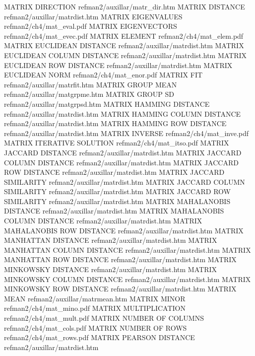 MATRIX DIRECTION                        refman2/auxillar/matr_dir.htm
MATRIX DISTANCE                         refman2/auxillar/matrdist.htm
MATRIX EIGENVALUES                      refman2/ch4/mat_eval.pdf
MATRIX EIGENVECTORS                     refman2/ch4/mat_evec.pdf
MATRIX ELEMENT                          refman2/ch4/mat_elem.pdf
MATRIX EUCLIDEAN DISTANCE               refman2/auxillar/matrdist.htm
MATRIX EUCLIDEAN COLUMN DISTANCE        refman2/auxillar/matrdist.htm
MATRIX EUCLIDEAN ROW DISTANCE           refman2/auxillar/matrdist.htm
MATRIX EUCLIDEAN NORM                   refman2/ch4/mat_enor.pdf
MATRIX FIT                              refman2/auxillar/matrfit.htm
MATRIX GROUP MEAN                       refman2/auxillar/matgrpme.htm
MATRIX GROUP SD                         refman2/auxillar/matgrpsd.htm
MATRIX HAMMING DISTANCE                 refman2/auxillar/matrdist.htm
MATRIX HAMMING COLUMN DISTANCE          refman2/auxillar/matrdist.htm
MATRIX HAMMING ROW DISTANCE             refman2/auxillar/matrdist.htm
MATRIX INVERSE                          refman2/ch4/mat_inve.pdf
MATRIX ITERATIVE SOLUTION               refman2/ch4/mat_itso.pdf
MATRIX JACCARD DISTANCE                 refman2/auxillar/matrdist.htm
MATRIX JACCARD COLUMN DISTANCE          refman2/auxillar/matrdist.htm
MATRIX JACCARD ROW DISTANCE             refman2/auxillar/matrdist.htm
MATRIX JACCARD SIMILARITY               refman2/auxillar/matrdist.htm
MATRIX JACCARD COLUMN SIMILARITY        refman2/auxillar/matrdist.htm
MATRIX JACCARD ROW SIMILARITY           refman2/auxillar/matrdist.htm
MATRIX MAHALANOBIS DISTANCE             refman2/auxillar/matrdist.htm
MATRIX MAHALANOBIS COLUMN DISTANCE      refman2/auxillar/matrdist.htm
MATRIX MAHALANOBIS ROW DISTANCE         refman2/auxillar/matrdist.htm
MATRIX MANHATTAN DISTANCE               refman2/auxillar/matrdist.htm
MATRIX MANHATTAN COLUMN DISTANCE        refman2/auxillar/matrdist.htm
MATRIX MANHATTAN ROW DISTANCE           refman2/auxillar/matrdist.htm
MATRIX MINKOWSKY DISTANCE               refman2/auxillar/matrdist.htm
MATRIX MINKOWSKY COLUMN DISTANCE        refman2/auxillar/matrdist.htm
MATRIX MINKOWSKY ROW DISTANCE           refman2/auxillar/matrdist.htm
MATRIX MEAN                             refman2/auxillar/matrmean.htm
MATRIX MINOR                            refman2/ch4/mat_mino.pdf
MATRIX MULTIPLICATION                   refman2/ch4/mat_mult.pdf
MATRIX NUMBER OF COLUMNS                refman2/ch4/mat_cols.pdf
MATRIX NUMBER OF ROWS                   refman2/ch4/mat_rows.pdf
MATRIX PEARSON DISTANCE                 refman2/auxillar/matrdist.htm
